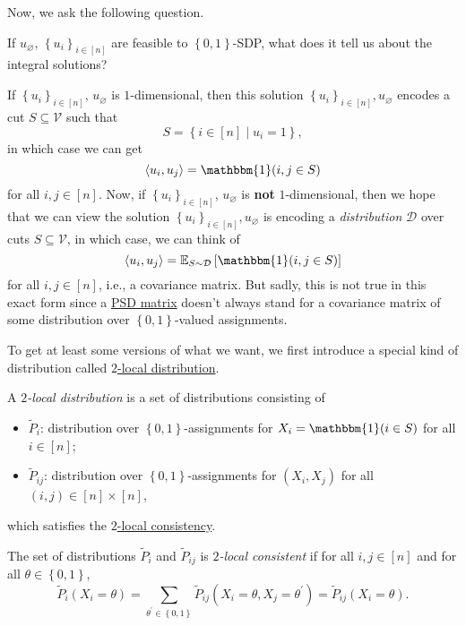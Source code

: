 Now, we ask the following question.

\begin{problem*}
	If \(u_\varnothing \), \(\left\{ u_{i}  \right\} _{i\in [n]}\) are feasible to \(\left\{ 0, 1 \right\} \)-SDP, what does it tell us about the integral solutions?
\end{problem*}
\begin{answer}
	If \(\left\{ u_i \right\} _{i\in [n]}\), \(u_\varnothing \) is \(1\)-dimensional, then this solution \(\left\{ u_i \right\} _{i\in [n]}, u_\varnothing\) encodes a cut \(S \subseteq \mathcal{V} \) such that
	\[
		S = \left\{ i\in [n] \mid u_i = 1 \right\},
	\]
	in which case we can get
	\[
		\left\langle u_i, u_j \right\rangle = \mathbbm{1}(i, j\in S)
	\]
	for all \(i, j\in [n]\). Now, if \(\left\{ u_i \right\} _{i\in [n]}\), \(u_\varnothing \) is \textbf{not} \(1\)-dimensional, then we hope that we can view the solution \(\left\{ u_i \right\} _{i\in [n]}, u_\varnothing \) is encoding a \emph{distribution} \(\mathcal{D} \) over cuts \(S \subseteq \mathcal{V} \), in which case, we can think of
	\[
		\left\langle u_i, u_j \right\rangle = \mathbb{E}_{S\sim \mathcal{D} }\left[ \mathbbm{1}(i, j\in S)\right]
	\]
	for all \(i, j\in [n]\), i.e., a covariance matrix. But sadly, this is not true in this exact form since a \hyperref[def:PSD]{PSD matrix} doesn't always stand for a covariance matrix of some distribution over \(\left\{ 0, 1 \right\} \)-valued assignments.
\end{answer}

To get at least some versions of what we want, we first introduce a special kind of distribution called \hyperref[def:2-local-distribution]{\(2\)-local distribution}.

\begin{definition}\label{def:2-local-distribution}
	A \emph{\(2\)-local distribution} is a set of distributions consisting of
	\begin{itemize}
		\item \(\widetilde{P} _i\): distribution over \(\left\{ 0, 1 \right\} \)-assignments for \(X_i= \mathbbm{1}(i\in S) \) for all \(i\in [n]\);
		\item \(\widetilde{P} _{ij}\): distribution over \(\left\{ 0, 1 \right\} \)-assignments for \((X_i, X_j)\) for all \((i, j)\in [n]\times [n]\),
	\end{itemize}
	which satisfies the \hyperref[def:2-local-consistency]{\(2\)-local consistency}.

	\begin{definition}\label{def:2-local-consistency}
		The set of distributions \(\widetilde{P} _i\) and \(\widetilde{P} _{ij}\) is \emph{\(2\)-local consistent} if for all \(i, j\in [n]\) and for all \(\theta \in \left\{ 0, 1 \right\} \),
		\[
			\widetilde{P} _i(X_i = \theta ) = \sum_{\theta ^\prime \in \left\{ 0, 1 \right\} } \widetilde{P} _{ij}(X_i=\theta , X_j = \theta ^\prime )= \widetilde{P} _{ij}(X_i = \theta ).
		\]
	\end{definition}

\end{definition}

